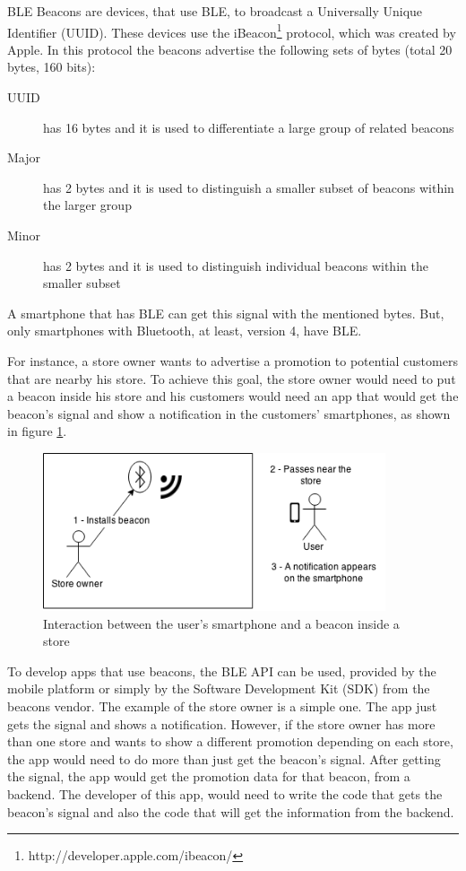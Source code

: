 BLE Beacons are devices, that use BLE, to broadcast a
Universally Unique Identifier (UUID).
These devices use the
iBeacon\footnote{http://developer.apple.com/ibeacon/}
protocol, which was created
by Apple\texttrademark. In this protocol the beacons
advertise the following sets of bytes
(total 20 bytes, 160 bits):
\begin{description}
  \item[UUID] has 16 bytes and it is used to differentiate a
  large group of related beacons
  \item[Major] has 2 bytes and it is used to distinguish a smaller
  subset of beacons within the larger group
  \item[Minor] has 2 bytes and it is used to distinguish individual
  beacons within the smaller subset
\end{description}
A smartphone that
has BLE can get this signal with the mentioned bytes.
But, only smartphones
with Bluetooth, at least, version 4, have BLE.

For instance, a store owner wants to advertise a promotion
to potential customers that are nearby his store. To
achieve this goal, the store owner would need to put
a beacon inside his store and his customers would need an
app that would get the beacon's signal and show a
notification in the customers' smartphones,
as shown in figure \ref{fig:store_example}.
\begin{figure}[!ht]
  \centering
    \includegraphics[width=0.9\textwidth]{images/store_example}
    \caption{Interaction between the user's smartphone
    and a beacon inside a store}
    \label{fig:store_example}
\end{figure}

To develop apps that use beacons, the
BLE API can be used, provided by the
mobile platform or simply by the Software
Development Kit (SDK) from the
beacons vendor. The example of the store owner is a
simple one. The app just gets the signal and shows a
notification. However, if the store owner has more than
one store and wants to show a different promotion depending
on each store, the app would need to do more than just get
the beacon's signal. After getting the signal, the app
would get the promotion data for that beacon, from a
backend. The developer of this app, would need to
write the code that gets the beacon's signal and also
the code that will get the information from the backend.


